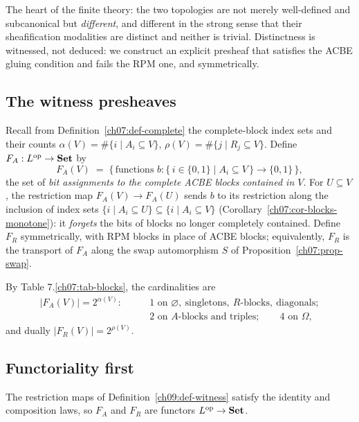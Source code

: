 The heart of the finite theory: the two topologies are not merely well-defined and subcanonical but \emph{different}, and different in the strong sense that their sheafification modalities are distinct and neither is trivial. Distinctness is witnessed, not deduced: we construct an explicit presheaf that satisfies the ACBE gluing condition and fails the RPM one, and symmetrically.

\subsection{The witness presheaves}

\begin{definition}\label{ch09:def-witness}
Recall from Definition~\ref{ch07:def-complete} the complete-block index sets and their counts $\alpha(V)=\#\{i\mid A_{i}\subseteq V\}$, $\rho(V)=\#\{j\mid R_{j}\subseteq V\}$. Define $F_{A}:L^{\mathrm{op}}\to\mathbf{Set}$ by
\[
F_{A}(V)\;=\;\bigl\{\,\text{functions } b:\{\,i\in\{0,1\}\mid A_{i}\subseteq V\,\}\to\{0,1\}\,\bigr\},
\]
the set of \emph{bit assignments to the complete ACBE blocks contained in $V$}. For $U\subseteq V$, the restriction map $F_{A}(V)\to F_{A}(U)$ sends $b$ to its restriction along the inclusion of index sets $\{i\mid A_{i}\subseteq U\}\subseteq\{i\mid A_{i}\subseteq V\}$ (Corollary~\ref{ch07:cor-blocks-monotone}): it \emph{forgets} the bits of blocks no longer completely contained. Define $F_{R}$ symmetrically, with RPM blocks in place of ACBE blocks; equivalently, $F_{R}$ is the transport of $F_{A}$ along the swap automorphism $S$ of Proposition~\ref{ch07:prop-swap}.
\end{definition}

By Table 7.\ref{ch07:tab-blocks}, the cardinalities are
\[
\begin{aligned}
|F_{A}(V)|=2^{\alpha(V)}:\qquad
&1 \text{ on } \varnothing,\ \text{singletons},\ R\text{-blocks},\ \text{diagonals};\\
&2 \text{ on } A\text{-blocks and triples};\qquad
4 \text{ on } \Omega,
\end{aligned}
\]
and dually $|F_{R}(V)|=2^{\rho(V)}$.

\subsection{Functoriality first}

\begin{lemma}\label{ch09:lem-functorial}
The restriction maps of Definition~\ref{ch09:def-witness} satisfy the identity and composition laws, so $F_{A}$ and $F_{R}$ are functors $L^{\mathrm{op}}\to\mathbf{Set}$.
\end{lemma}

